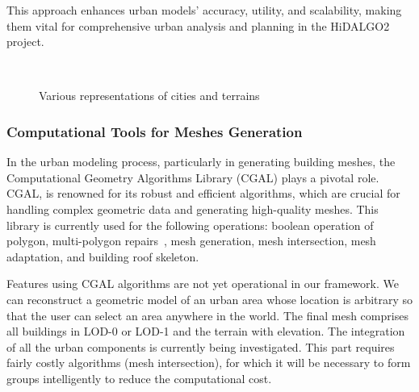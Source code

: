 \documentclass[runningheads]{llncs}
\begin{document}
This approach enhances urban models' accuracy, utility, and scalability, making them vital for comprehensive urban analysis and planning in the HiDALGO2 project.

\begin{figure}[ht]
\centering
{}
\hfill %
\\ %


\caption{Various representations of cities and terrains}
\label{fig:city-strasbourg}
\vspace{-0.5cm}
\end{figure}

\subsubsection{Computational Tools for Meshes Generation}

In the urban modeling process, particularly in generating building meshes, the Computational Geometry Algorithms Library (CGAL) plays a pivotal role. CGAL, \cite{the_cgal_project_cgal_2024} is renowned for its robust and efficient algorithms, which are crucial for handling complex geometric data and generating high-quality meshes. This library is currently used for the following operations: boolean operation of polygon, multi-polygon repairs~\cite{loriot_polygon_2024}, mesh generation, mesh intersection, mesh adaptation, and building roof skeleton.

Features using CGAL algorithms are not yet operational in our framework. We can reconstruct a geometric model of an urban area whose location is arbitrary so that the user can select an area anywhere in the world. The final mesh comprises all buildings in LOD-0 or LOD-1 and the terrain with elevation. The integration of all the urban components is currently being investigated. This part requires fairly costly algorithms (mesh intersection), for which it will be necessary to form groups intelligently to reduce the computational cost.  
\end{document}
